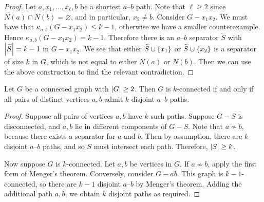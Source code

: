 \begin{proof}
	Let \( a, x_1, \dots, x_\ell, b \) be a shortest \( a \)--\( b \) path.
	Note that \( \ell \geq 2 \) since \( N(a) \cap N(b) = \varnothing \), and in particular, \( x_2 \neq b \).
	Consider \( G - x_1x_2 \).
	We must have that \( \kappa_{a,b}(G - x_1x_2) \leq k - 1 \), otherwise we have a smaller counterexample.
	Hence \( \kappa_{a,b}(G - x_1x_2) = k - 1 \).
	Therefore there is an \( a \)--\( b \) separator \( \widetilde S \) with \( \abs{\widetilde S} = k - 1 \) in \( G - x_1x_2 \).
	We see that either \( \widetilde S \cup \qty{x_1} \) or \( \widetilde S \cup \qty{x_2} \) is a separator of size \( k \) in \( G \), which is not equal to either \( N(a) \) or \( N(b) \).
	Then we can use the above construction to find the relevant contradiction.
\end{proof}
\begin{corollary}
	Let \( G \) be a connected graph with \( \abs{G} \geq 2 \).
	Then \( G \) is \( k \)-connected if and only if all pairs of distinct vertices \( a,b \) admit \( k \) disjoint \( a \)--\( b \) paths.
\end{corollary}
\begin{proof}
	Suppose all pairs of vertices \( a,b \) have \( k \) such paths.
	Suppose \( G - S \) is disconnected, and \( a, b \) lie in different components of \( G - S \).
	Note that \( a \not\sim b \), because there exists a separator for \( a \) and \( b \).
	Then by assumption, there are \( k \) disjoint \( a \)--\( b \) paths, and so \( S \) must intersect each path.
	Therefore, \( \abs{S} \geq k \).

	Now suppose \( G \) is \( k \)-connected.
	Let \( a, b \) be vertices in \( G \).
	If \( a \not\sim b \), apply the first form of Menger's theorem.
	Conversely, consider \( G - ab \).
	This graph is \( k - 1 \)-connected, so there are \( k - 1 \) disjoint \( a \)--\( b \) by Menger's theorem.
	Adding the additional path \( a, b \), we obtain \( k \) disjoint paths as required.
\end{proof}


